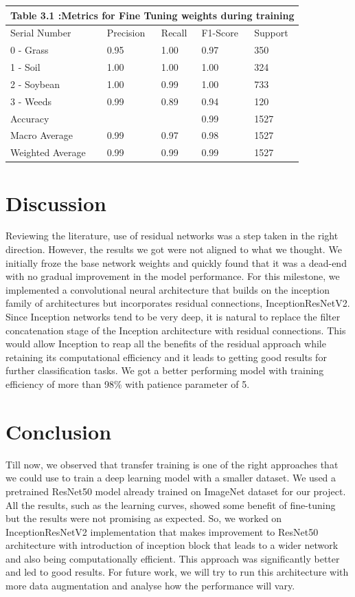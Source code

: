 \documentclass{report}
\begin{document}
\begin{tabular}[H]{ | p{3cm}||p{2cm}||p{2cm}||p{2cm}||p{2cm}|}
\hline
 \multicolumn{5}{|c|}{ Table 3.1 :Metrics for Fine Tuning weights during training}\\
 \hline
 Serial Number & Precision & Recall & F1-Score & Support\\
 \hline
 0 - Grass & 0.95 & 1.00 & 0.97 & 350 \\
 1 - Soil & 1.00 & 1.00 & 1.00 & 324\\
 2 - Soybean & 1.00 & 0.99 & 1.00 & 733\\
 3 - Weeds & 0.99 & 0.89 & 0.94 & 120 \\
 Accuracy &  &  & 0.99 & 1527\\
 Macro Average & 0.99 & 0.97 & 0.98 & 1527\\
 Weighted Average & 0.99 & 0.99 & 0.99 & 1527\\
 \hline

\end{tabular}

\section{Discussion}

Reviewing the literature, use of residual networks was a step taken in the right
direction. However, the results we got were not aligned to what we thought. We initially froze the base network weights and quickly found that it was
a dead-end with no gradual improvement in the model performance. For this milestone, we implemented a convolutional neural architecture that builds on the inception family of architectures but incorporates residual connections, InceptionResNetV2. Since Inception networks tend to be very deep, it is natural to replace the filter concatenation stage of the Inception
architecture with residual connections. This would allow
Inception to reap all the benefits of the residual approach
while retaining its computational efficiency  \cite{szegedy2017inception} and it leads to getting good results for further classification tasks. We got a better performing model with training efficiency of more than 98\% with patience parameter of 5.

\section{Conclusion}
Till now, we observed that transfer training is one of the right approaches that we could use to train a deep learning model with a smaller dataset. We used a pretrained ResNet50 model already trained on ImageNet dataset for our project. All the results, such as the learning curves, showed some benefit of fine-tuning but the results were not promising as expected. So, we worked on InceptionResNetV2 implementation that makes improvement to ResNet50 architecture with introduction of inception block that leads to a wider network and also being computationally efficient. This approach was significantly better and led to good results. For future work, we will try to run this architecture with more data augmentation and analyse how the performance will vary.
\end{document}
